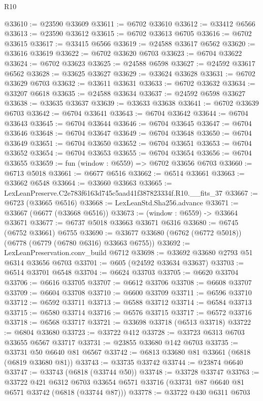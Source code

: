 \begin{lexlean}{R10}
\begin{coremodule}
@33610 := @23590 @33609
@33611 := @6702 @33610
@33612 := @33412 @6566
@33613 := @23590 @33612
@33615 := @6702 @33613 @6705
@33616 := @6702 @33615
@33617 := @33415 @6566
@33619 := @24588 @33617 @6562
@33620 := @33616 @33619
@33622 := @6702 @33620 @6703
@33623 := @6704 @33622
@33624 := @6702 @33623
@33625 := @24588 @6598
@33627 := @24592 @33617 @6562
@33628 := @33625 @33627
@33629 := @33624 @33628
@33631 := @6702 @33629 @6703
@33632 := @33611 @33631
@33633 := @6702 @33632
@33634 := @33207 @6618
@33635 := @24588 @33634
@33637 := @24592 @6598 @33627
@33638 := @33635 @33637
@33639 := @33633 @33638
@33641 := @6702 @33639 @6703
@33642 := @6704 @33641
@33643 := @6704 @33642
@33644 := @6704 @33643
@33645 := @6704 @33644
@33646 := @6704 @33645
@33647 := @6704 @33646
@33648 := @6704 @33647
@33649 := @6704 @33648
@33650 := @6704 @33649
@33651 := @6704 @33650
@33652 := @6704 @33651
@33653 := @6704 @33652
@33654 := @6704 @33653
@33655 := @6704 @33654
@33656 := @6704 @33655
@33659 := fun (window : @6559) => @6702 @33656 @6703
@33660 := @6713 @5018
@33661 := @6677 @6516
@33662 := @6514 @33661
@33663 := @33662 @6548
@33664 := @33660 @33663
@33665 := LexLeanPreserve.C2e783f6163d745c5aad41f387823334f.R10.__fits_37
@33667 := @6723 (@33665 @6516)
@33668 := LexLeanStd.Sha256.advance
@33671 := @33667 (@6677 (@33668 @6516))
@33673 := (window : @6559) -> @33664 @33671
@33677 := @6737 @5018 @33663 @33671 @6316
@33680 := @6745 (@6752 @33661) @6755
@33690 := @33677 @33680 (@6762 (@6772 @5018)) (@6778 (@6779 (@6780 @6316) @33663 @6755))
@33692 := LexLeanPreservation.conv_build @6712
@33698 := @33692 @33680 @2793 @51 @6314 @33656 @6703
@33701 := @605 (@24592 @33634 @33637)
@33703 := @6514 @33701 @6548
@33704 := @6624 @33703
@33705 := @6620 @33704
@33706 := @6616 @33705
@33707 := @6612 @33706
@33708 := @6608 @33707
@33709 := @6604 @33708
@33710 := @6600 @33709
@33711 := @6596 @33710
@33712 := @6592 @33711
@33713 := @6588 @33712
@33714 := @6584 @33713
@33715 := @6580 @33714
@33716 := @6576 @33715
@33717 := @6572 @33716
@33718 := @6568 @33717
@33721 := @33698 @33718 (@6513 @33718)
@33722 := @6804 @33680
@33723 := @33722 @412
@33728 := @33723 @6313 @6703 @33655 @6567 @33717
@33731 := @23855 @33680 @142 @6703
@33735 := @33731 @50 @6640 @81 @6567
@33742 := @6813 @33680 @81 @33661 (@6818 (@6819 @33680 @81))
@33743 := @33735 @33742
@33744 := @23874 @6640
@33747 := @33743 (@6818 (@33744 @50))
@33748 := @33728 @33747
@33763 := @33722
    @421
    @6312
    @6703
    @33654
    @6571
    @33716
    (@33731 @87 @6640 @81 @6571 @33742 (@6818 (@33744 @87)))
@33778 := @33722
    @430
    @6311
    @6703

\end{coremodule}
\end{lexlean}
